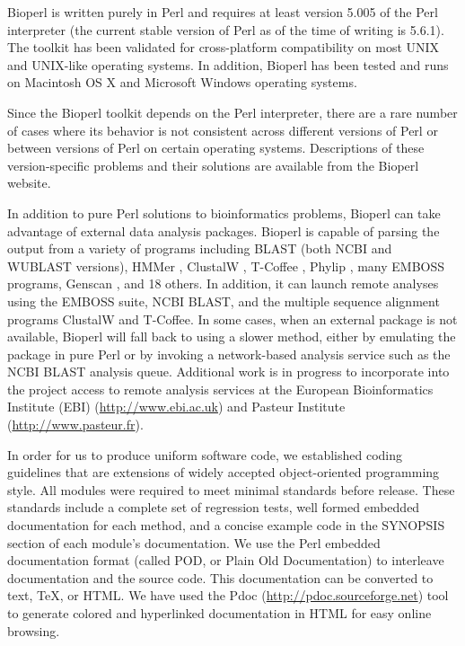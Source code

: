 \documentclass[12pt]{article}
\begin{document}
Bioperl is written purely in Perl and requires at least version 5.005
of the Perl interpreter (the current stable version of Perl as of the
time of writing is 5.6.1).  The toolkit has been validated for
cross-platform compatibility on most UNIX and UNIX-like operating
systems.  In addition, Bioperl has been tested and runs on Macintosh
OS X and Microsoft Windows operating systems.  

Since the Bioperl toolkit depends on the Perl interpreter, there are a
rare number of cases where its behavior is not consistent across
different versions of Perl or between versions of Perl on certain
operating systems.  Descriptions of these version-specific problems
and their solutions are available from the Bioperl website.

In addition to pure Perl solutions to bioinformatics problems, Bioperl
can take advantage of external data analysis packages.  Bioperl is
capable of parsing the output from a variety of programs including BLAST (both
NCBI and WUBLAST \cite{wublast} versions), HMMer \cite{hmmer}, 
ClustalW \cite{clustalw}, T-Coffee \cite{tcoffee}, 
Phylip \cite{phylip}, many EMBOSS \cite{emboss} programs, 
Genscan \cite{genscan}, and 18 others.
In addition, it can launch remote analyses using the EMBOSS
suite, NCBI BLAST, and the multiple sequence alignment
programs ClustalW and T-Coffee.  In
some cases, when an external package is not available, Bioperl will
fall back to using a slower method, either by emulating the package in
pure Perl or by invoking a network-based analysis service such as the
NCBI BLAST analysis queue.  Additional work is in progress to
incorporate into the project access to remote analysis services at the
European Bioinformatics Institute (EBI) (\url{http://www.ebi.ac.uk}) and
Pasteur Institute (\url{http://www.pasteur.fr}).

In order for us to produce uniform software code, we established
coding guidelines that are extensions of widely accepted
object-oriented programming style.  All modules were required to meet
minimal standards before release.  These standards include a complete
set of regression tests, well formed embedded documentation for each
method, and a concise example code in the SYNOPSIS section of each
module's documentation.  We use the Perl embedded documentation format
(called POD, or Plain Old Documentation) to interleave documentation and
the source code.  This documentation can be converted to text, TeX, or
HTML.  We have used the Pdoc (\url{http://pdoc.sourceforge.net}) tool to
generate colored and hyperlinked documentation in HTML for easy
online browsing.
\end{document}
